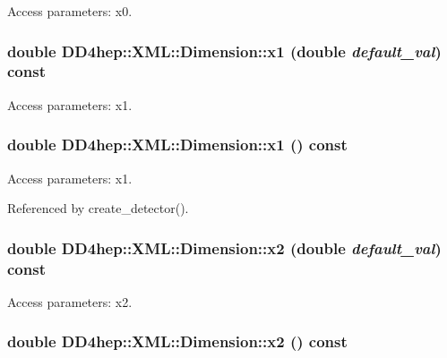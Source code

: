 Access parameters: x0. \hypertarget{struct_d_d4hep_1_1_x_m_l_1_1_dimension_aa4a60a2ff14e89139f2f4070f242db28}{
\subsubsection[{x1}]{\setlength{\rightskip}{0pt plus 5cm}double DD4hep::XML::Dimension::x1 (double {\em default\_\-val}) const}}
\label{struct_d_d4hep_1_1_x_m_l_1_1_dimension_aa4a60a2ff14e89139f2f4070f242db28}


Access parameters: x1. \hypertarget{struct_d_d4hep_1_1_x_m_l_1_1_dimension_a6ab0a2e9f1c1b8b32bedb25bd8a86c03}{
\subsubsection[{x1}]{\setlength{\rightskip}{0pt plus 5cm}double DD4hep::XML::Dimension::x1 () const}}
\label{struct_d_d4hep_1_1_x_m_l_1_1_dimension_a6ab0a2e9f1c1b8b32bedb25bd8a86c03}


Access parameters: x1. 

Referenced by create\_\-detector().\hypertarget{struct_d_d4hep_1_1_x_m_l_1_1_dimension_a98a1821ca04622f93b8ab259b978979e}{
\subsubsection[{x2}]{\setlength{\rightskip}{0pt plus 5cm}double DD4hep::XML::Dimension::x2 (double {\em default\_\-val}) const}}
\label{struct_d_d4hep_1_1_x_m_l_1_1_dimension_a98a1821ca04622f93b8ab259b978979e}


Access parameters: x2. \hypertarget{struct_d_d4hep_1_1_x_m_l_1_1_dimension_ab7251c41012d03e5ffcac14b3d3fa5c0}{
\subsubsection[{x2}]{\setlength{\rightskip}{0pt plus 5cm}double DD4hep::XML::Dimension::x2 () const}}
\label{struct_d_d4hep_1_1_x_m_l_1_1_dimension_ab7251c41012d03e5ffcac14b3d3fa5c0}


